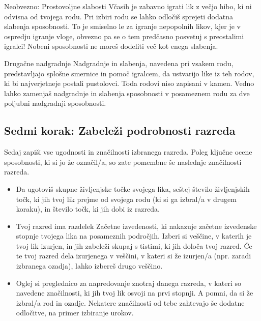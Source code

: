 \begin{rpg-titlebox}{Neobvezno: Prostovoljne slabosti}
    Včasih je zabavno igrati lik z večjo hibo, ki ni odvisna od tvojega rodu. Pri izbiri rodu se lahko odločiš sprejeti dodatna slabenja sposobnosti. To je smiselno le za igranje nepopolnih likov, kjer je v ospredju igranje vloge, obvezno pa se o tem predčasno posvetuj s preostalimi igralci! Nobeni sposobnosti ne moreš dodeliti več kot enega slabenja.
\end{rpg-titlebox}

\begin{rpg-titlebox}{Drugačne nadgradnje}
    Nadgradnje in slabenja, navedena pri vsakem rodu, predstavljajo splošne smernice in pomoč igralcem, da ustvarijo like iz teh rodov, ki bi najverjetneje postali pustolovci. Toda rodovi niso zapisani v kamen. Vedno lahko zamenjaš nadgradnje in slabenja sposobnosti v posameznem rodu za dve poljubni nadgradnji sposobnosti.
\end{rpg-titlebox}

\subsection{Sedmi korak: Zabeleži podrobnosti razreda}
Sedaj zapiši vse ugodnosti in značilnosti izbranega razreda. Poleg ključne ocene sposobnosti, ki si jo že označil/a, so zate pomembne še naslednje značilnosti razreda.

\begin{itemize}
    \item Da ugotoviš skupne življenjske točke svojega lika, seštej število življenjskih točk, ki jih tvoj lik prejme od svojega rodu (ki si ga izbral/a v drugem koraku), in število točk, ki jih dobi iz razreda.
    \item Tvoj razred ima razdelek Začetne izvedenosti, ki nakazuje začetne izvedenske stopnje tvojega lika na posameznih področjih. Izberi si veščine, v katerih je tvoj lik izurjen, in jih zabeleži skupaj s tistimi, ki jih določa tvoj razred. Če te tvoj razred dela izurjenega v veščini, v kateri si že izurjen/a (npr. zaradi izbranega ozadja), lahko izbereš drugo veščino.
    \item Oglej si preglednico za napredovanje znotraj danega razreda, v kateri so navedene značilnosti, ki jih tvoj lik osvoji na prvi stopnji. A pomni, da si že izbral/a rod in ozadje. Nekatere značilnosti od tebe zahtevajo še dodatne odločitve, na primer izbiranje urokov.
\end{itemize}

